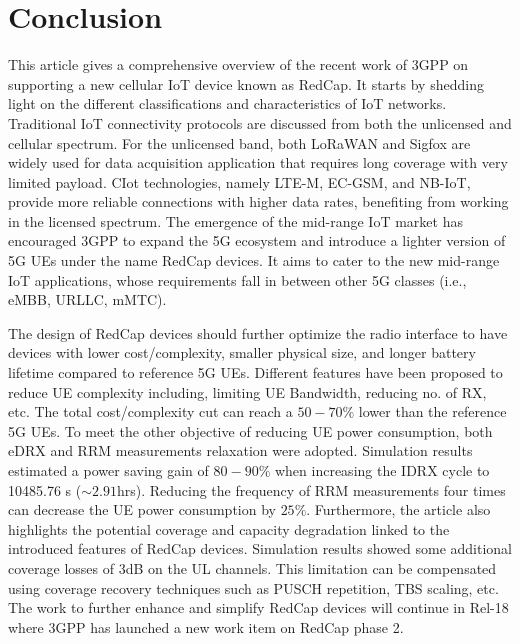 \documentclass[]{IEEEtran}
\begin{document}


\section{Conclusion}
\label{sec:7-conclusion}
This article gives a comprehensive overview of the recent work of 3GPP on supporting a new cellular IoT device known as RedCap.
It starts by shedding light on the different classifications and characteristics of IoT networks.
Traditional IoT connectivity protocols are discussed from both the unlicensed and cellular spectrum.
For the unlicensed band, both LoRaWAN and Sigfox are widely used for data acquisition application that requires long coverage with very limited payload.
CIot technologies, namely LTE-M, EC-GSM, and NB-IoT, provide more reliable connections with higher data rates, benefiting from working in the licensed spectrum.
The emergence of the mid-range IoT market has encouraged 3GPP to expand the 5G ecosystem and introduce a lighter version of 5G UEs under the name RedCap devices.
It aims to cater to the new mid-range IoT applications, whose requirements fall in between other 5G classes (i.e., eMBB, URLLC, mMTC).

The design of RedCap devices should further optimize the radio interface to have devices with lower cost/complexity, smaller physical size, and longer battery lifetime compared to reference 5G UEs.
Different features have been proposed to reduce UE complexity including, limiting UE Bandwidth, reducing no. of RX, etc.
The total cost/complexity cut can reach a $50-70\%$ lower than the reference 5G UEs.
To meet the other objective of reducing UE power consumption, both eDRX and RRM measurements relaxation were adopted.
Simulation results estimated a power saving gain of $80-90\%$ when increasing the IDRX cycle to 10485.76 s ($\sim 2.91$hrs).
Reducing the frequency of RRM measurements four times can decrease the UE power consumption by $25\%$.
Furthermore, the article also highlights the potential coverage and capacity degradation linked to the introduced features of RedCap devices.
Simulation results showed some additional coverage losses of 3dB on the UL channels.
This limitation can be compensated using coverage recovery techniques such as PUSCH repetition, TBS scaling, etc.
The work to further enhance and simplify RedCap devices will continue in Rel-18 where 3GPP has launched a new work item on RedCap phase 2.
\cite{TR_38_875}
\cite{R2-1912334}


\end{document}
